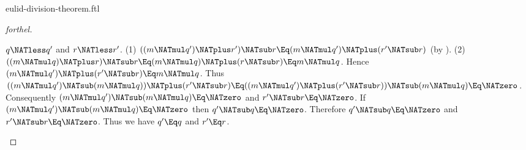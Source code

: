 \documentclass{stex}
\begin{document}
\begin{smodule}{eulid-division-theorem.ftl}
\begin{proof}[forthel]
  \begin{case}{$q \NATless q'$ and $r \NATless r'$.}
    (1) $((m \NATmul q') \NATplus r') \NATsub r \Eq (m \NATmul q') \NATplus (r' \NATsub r)$ (by ).
    (2) $((m \NATmul q) \NATplus r) \NATsub r
      \Eq (m \NATmul q) \NATplus (r \NATsub r)
      \Eq m \NATmul q$.
    Hence $(m \NATmul q') \NATplus (r' \NATsub r) \Eq m \NATmul q$.
    Thus $((m \NATmul q') \NATsub (m \NATmul q)) \NATplus (r' \NATsub r)
      \Eq ((m \NATmul q') \NATplus (r' \NATsub r)) \NATsub (m \NATmul q)
      \Eq \NATzero$.
    Consequently $(m \NATmul q') \NATsub (m \NATmul q) \Eq \NATzero$ and $r' \NATsub r \Eq \NATzero$.
    If $(m \NATmul q') \NATsub (m \NATmul q) \Eq \NATzero$ then $q' \NATsub q \Eq \NATzero$.
    Therefore $q' \NATsub q \Eq \NATzero$ and $r' \NATsub r \Eq \NATzero$.
    Thus we have $q' \Eq q$ and $r' \Eq r$.
  \end{case}
\end{proof}
\end{smodule}
\end{document}
